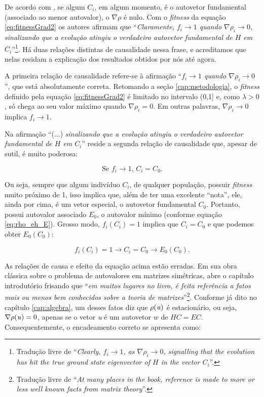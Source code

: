 De acordo com \cite{metodo2004}, se algum $C_i$, em algum momento, é o autovetor fundamental (associado ao menor autovalor), o $\nabla \rho$ é nulo. Com o \textit{fitness} da equação \eqref{eq:fitnessGrad2} os autores afirmam que ``\textit{Claramente, $f_i \rightarrow 1$ quando $\nabla \rho_i \rightarrow 0$, sinalizando que a evolução atingiu o verdadeiro autovetor fundamental de $H$ em $C_i$}''\footnote{Tradução livre de ``\textit{Clearly, $f_i \rightarrow 1$, as $\nabla \rho_i \rightarrow 0$, signalling that the evolution has hit the true ground state eigenvector of $H$ in the vector $C_i$}''.}. Há duas relações distintas de causalidade nessa frase, e acreditamos que nelas residam a explicação dos resultados obtidos por nós até agora.

A primeira relação de causalidade refere-se à afirmação ``\textit{$f_i \rightarrow 1$ quando $\nabla \rho_i \rightarrow 0$}'', que está absolutamente correta. Retomando a seção \ref{cap:metodologia}, o \textit{fitness} definido pela equação \ref{eq:fitnessGrad2} é limitado no intervalo (0,1] e, como $\lambda > 0$, só chega ao seu valor máximo quando $\nabla \rho_i = 0$. Em outras palavras, $\nabla \rho_i \rightarrow 0$ implica $f_i \rightarrow 1$.

Na afirmação ``(...) \textit{sinalizando que a evolução atingiu o verdadeiro autovetor fundamental de $H$ em $C_i$}'' reside a segunda relação de causalidade que, apesar de sutil, é muito poderosa:

\begin{equation}\label{eq:afirmacaoErrada}
	\mbox{Se } f_i \rightarrow 1\mbox{, } C_i = C_0.
\end{equation}

Ou seja, sempre que algum indivíduo $C_i$, de qualquer população, possuir \textit{fitness} muito próximo de 1, isso implica que, além de ter uma excelente ``nota'', ele, ainda por cima, é um vetor especial, o autovetor fundamental $C_0$. Portanto, possui autovalor associado $E_0$, o autovalor mínimo (conforme equação \ref{eq:rho_eh_E}). Grosso modo, $f_i(C_i) = 1$ implica que $C_i = C_0$ e que podemos obter $E_0(C_0)$:

\begin{equation}\label{eq:causalidadeErrada}
	f_i(C_i) = 1 \rightarrow C_i = C_0 \rightarrow E_0(C_0).
\end{equation}

As relações de causa e efeito da equação acima estão erradas. Em sua obra clássica sobre o problema de autovalores em matrizes simétricas, \cite{Parlett1998} abre o capítulo introdutório frisando que ``\textit{em muitos lugares no livro, é feita referência a fatos mais ou menos bem conhecidos sobre a teoria de matrizes}''\footnote{Tradução livre de ``\textit{At many places in the book, reference is made to more or less well known facts from matrix theory}''.}. Conforme já dito no capítulo \ref{cap:algebra}, um desses fatos diz que $\rho(\mbox{\textit{u}})$ é estacionário, ou seja, $\nabla \rho(\mbox{\textit{u}}) = 0$, apenas se o vetor \textit{u} é um autovetor $w$ de $HC = EC$. Consequentemente, o encadeamento correto se apresenta como:


